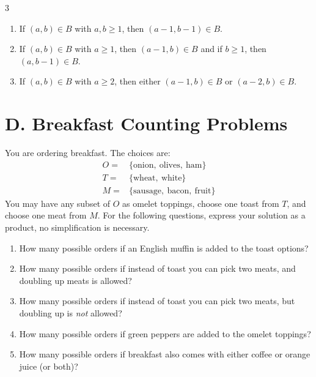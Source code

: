 \documentclass[9pt]{article}
\begin{document}
\begin{multicols}{3}
\begin{enumerate}[label=\arabic*., start=1]
\item
If $(a,b)\in B$ with $a,b \geq 1$, then $(a-1,b-1)\in B$.

\item
If $(a,b)\in B$ with $a\geq 1$, then $(a-1,b)\in B$ and if $b\geq 1$, then $(a,b-1)\in B$.

\item
If $(a,b)\in B$ with $a \geq 2$, then either $(a-1,b)\in B$ or $(a-2,b)\in B$.

\end{enumerate}
\vfill
\section*{D. Breakfast Counting Problems}

You are ordering breakfast. The choices are:
\begin{align*}
O=&\{\text{onion},\ \text{olives},\ \text{ham}\}\\
T=&\{\text{wheat},\ \text{white}\}\\
M=&\{\text{sausage},\ \text{bacon},\ \text{fruit}\}
\end{align*}
You may have any subset of $O$ as omelet toppings, choose one toast from $T$, and choose one meat from $M$. For the following questions, express your solution as a product, no simplification is necessary.

\begin{enumerate}[label=\arabic*., start=1]

\item  
How many possible orders if an English muffin is added to the toast options?

\item  
How many possible orders if instead of toast you can pick two meats, and doubling up meats is allowed?

\item  
How many possible orders if instead of toast you can pick two meats, but doubling up is \emph{not} allowed?

\item  
How many possible orders if green peppers are added to the omelet toppings?

\item  
How many possible orders if breakfast also comes with either coffee or orange juice (or both)?

\end{enumerate}

\end{multicols}
\newpage
\end{document}
